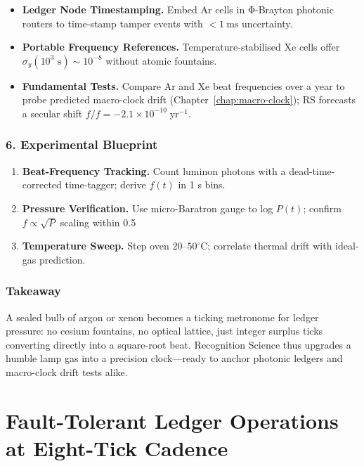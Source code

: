 \documentclass[11pt,oneside]{book}
\begin{document}
\begin{itemize}
\item \textbf{Ledger Node Timestamping.}  
      Embed Ar cells in Φ-Brayton photonic routers to time-stamp tamper
      events with $<1~\text{ms}$ uncertainty.
\item \textbf{Portable Frequency References.}  
      Temperature-stabilised Xe cells offer
      $\sigma_y(10^3\text{ s})\sim10^{-8}$ without atomic fountains.
\item \textbf{Fundamental Tests.}  
      Compare Ar and Xe beat frequencies over a year to probe predicted
      macro-clock drift (Chapter~\ref{chap:macro-clock});
      RS forecasts a secular shift $\dot f/f = -2.1\times10^{-10}\;\text{yr}^{-1}$.
\end{itemize}

\subsubsection*{6. Experimental Blueprint}

\begin{enumerate}[label=\textbf{\arabic*.}, leftmargin=1.2cm]
\item \textbf{Beat-Frequency Tracking.}  
      Count luminon photons with a dead-time-corrected time-tagger;
      derive $f(t)$ in 1 s bins.
\item \textbf{Pressure Verification.}  
      Use micro-Baratron gauge to log $P(t)$; confirm
      $f\propto\sqrt{P}$ scaling within 0.5 %
\item \textbf{Temperature Sweep.}  
      Step oven $20$–$50^\circ$C; correlate thermal drift with ideal-gas
      prediction.
\end{enumerate}

\subsubsection*{Takeaway}

A sealed bulb of argon or xenon becomes a ticking metronome for ledger
pressure: no cesium fountains, no optical lattice, just integer surplus
ticks converting directly into a square-root beat.
Recognition Science thus upgrades a humble lamp gas into a precision
clock—ready to anchor photonic ledgers and macro-clock drift tests alike.

\bigskip

\section{Fault-Tolerant Ledger Operations at Eight-Tick Cadence}
\label{sec:fault-tolerant-ledger}
\end{document}
